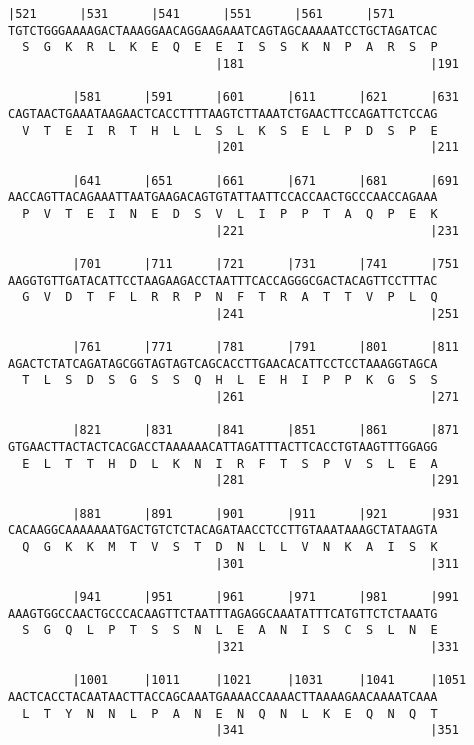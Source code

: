 \documentclass{article}
\begin{document}
\begin{Verbatim}[fontfamily=courier]
         |521      |531      |541      |551      |561      |571
TGTCTGGGAAAAGACTAAAGGAACAGGAAGAAATCAGTAGCAAAAATCCTGCTAGATCAC
  S  G  K  R  L  K  E  Q  E  E  I  S  S  K  N  P  A  R  S  P
                             |181                          |191

         |581      |591      |601      |611      |621      |631
CAGTAACTGAAATAAGAACTCACCTTTTAAGTCTTAAATCTGAACTTCCAGATTCTCCAG
  V  T  E  I  R  T  H  L  L  S  L  K  S  E  L  P  D  S  P  E
                             |201                          |211

         |641      |651      |661      |671      |681      |691
AACCAGTTACAGAAATTAATGAAGACAGTGTATTAATTCCACCAACTGCCCAACCAGAAA
  P  V  T  E  I  N  E  D  S  V  L  I  P  P  T  A  Q  P  E  K
                             |221                          |231

         |701      |711      |721      |731      |741      |751
AAGGTGTTGATACATTCCTAAGAAGACCTAATTTCACCAGGGCGACTACAGTTCCTTTAC
  G  V  D  T  F  L  R  R  P  N  F  T  R  A  T  T  V  P  L  Q
                             |241                          |251

         |761      |771      |781      |791      |801      |811
AGACTCTATCAGATAGCGGTAGTAGTCAGCACCTTGAACACATTCCTCCTAAAGGTAGCA
  T  L  S  D  S  G  S  S  Q  H  L  E  H  I  P  P  K  G  S  S
                             |261                          |271

         |821      |831      |841      |851      |861      |871
GTGAACTTACTACTCACGACCTAAAAAACATTAGATTTACTTCACCTGTAAGTTTGGAGG
  E  L  T  T  H  D  L  K  N  I  R  F  T  S  P  V  S  L  E  A
                             |281                          |291

         |881      |891      |901      |911      |921      |931
CACAAGGCAAAAAAATGACTGTCTCTACAGATAACCTCCTTGTAAATAAAGCTATAAGTA
  Q  G  K  K  M  T  V  S  T  D  N  L  L  V  N  K  A  I  S  K
                             |301                          |311

         |941      |951      |961      |971      |981      |991
AAAGTGGCCAACTGCCCACAAGTTCTAATTTAGAGGCAAATATTTCATGTTCTCTAAATG
  S  G  Q  L  P  T  S  S  N  L  E  A  N  I  S  C  S  L  N  E
                             |321                          |331

         |1001     |1011     |1021     |1031     |1041     |1051
AACTCACCTACAATAACTTACCAGCAAATGAAAACCAAAACTTAAAAGAACAAAATCAAA
  L  T  Y  N  N  L  P  A  N  E  N  Q  N  L  K  E  Q  N  Q  T
                             |341                          |351

\end{Verbatim}
\end{document}
